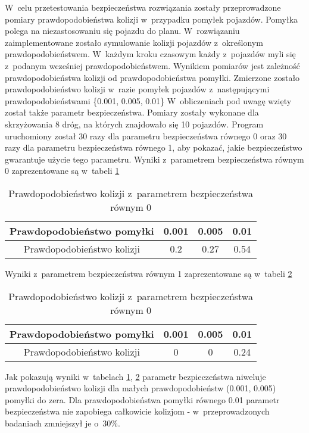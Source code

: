 W~celu przetestowania bezpieczeństwa rozwiązania zostały przeprowadzone pomiary prawdopodobieństwa kolizji w~przypadku pomyłek pojazdów. Pomyłka polega na niezastosowaniu się pojazdu do planu. W~rozwiązaniu zaimplementowane zostało symulowanie kolizji pojazdów z~określonym prawdopodobieństwem. W~każdym kroku czasowym każdy z~pojazdów myli się z~podanym wcześniej prawdopodobieństwem. Wynikiem pomiarów jest zależność prawdopodobieństwa kolizji od prawdopodobieństwa pomyłki. Zmierzone zostało prawdopodobieństwo kolizji w~razie pomyłek pojazdów z~następującymi prawdopodobieństwami \{0.001, 0.005, 0.01\}
\newline
\indent
W~obliczeniach pod uwagę wzięty został także parametr bezpieczeństwa. Pomiary zostały wykonane dla skrzyżowania 8 dróg, na których znajdowało się 10 pojazdów. Program uruchomiony został 30 razy dla parametru bezpieczeństwa równego 0 oraz 30 razy dla parametru bezpieczeństwa równego 1, aby pokazać, jakie bezpieczeństwo gwarantuje użycie tego parametru.
\newline
\newline
Wyniki z~parametrem bezpieczeństwa równym 0 zaprezentowane są w~tabeli \ref{firstCollision}
\begin{table}[H]
    \centering
    \begin{tabular}{|c|c|c|c|}
      \hline 
      Prawdopodobieństwo pomyłki & 0.001 & 0.005 & 0.01 \\
      \hline
      Prawdopodobieństwo kolizji & 0.2 & 0.27 & 0.54 \\
      \hline
    \end{tabular} 
    \caption{Prawdopodobieństwo kolizji z~parametrem bezpieczeństwa równym 0}
    \label{firstCollision}
\end{table}
\noindent
Wyniki z~parametrem bezpieczeństwa równym 1 zaprezentowane są w~tabeli \ref{secondCollision}
\begin{table}[H]
    \centering
    \begin{tabular}{|c|c|c|c|}
      \hline 
      Prawdopodobieństwo pomyłki & 0.001 & 0.005 & 0.01 \\
      \hline
      Prawdopodobieństwo kolizji & 0 & 0 & 0.24 \\
      \hline
    \end{tabular} 
    \caption{Prawdopodobieństwo kolizji z~parametrem bezpieczeństwa równym 0}
    \label{secondCollision}
\end{table}
Jak pokazują wyniki w~tabelach \ref{firstCollision}, \ref{secondCollision} parametr bezpieczeństwa niweluje prawdopodobieństwo kolizji dla małych prawdopodobieństw (0.001, 0.005) pomyłki do zera. Dla prawdopodobieństwa pomyłki równego 0.01 parametr bezpieczeństwa nie zapobiega całkowicie kolizjom - w~przeprowadzonych badaniach zmniejszył je o~30\%.

